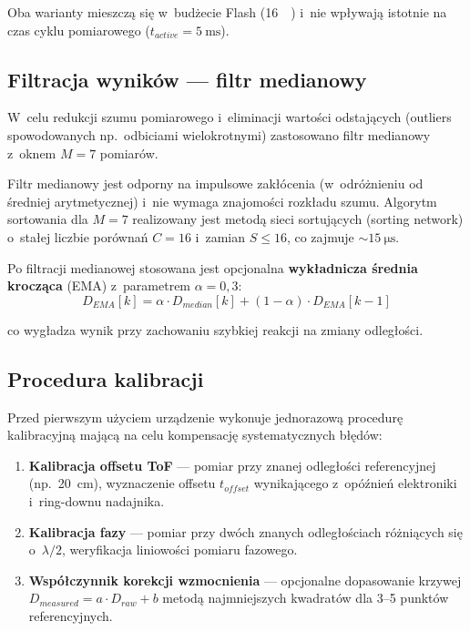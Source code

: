 \documentclass[a4paper,11pt]{article}
\begin{document}
Oba warianty mieszczą się w~budżecie Flash (\SI{16}{\kilo\byte}) i~nie wpływają
istotnie na czas cyklu pomiarowego ($t_{active} = \SI{5}{\milli\second}$).

\subsection{Filtracja wyników --- filtr medianowy}
\label{sec:filtr}

W~celu redukcji szumu pomiarowego i~eliminacji wartości odstających (outliers
spowodowanych np.\ odbiciami wielokrotnymi) zastosowano filtr medianowy
z~oknem $M = 7$ pomiarów.

Filtr medianowy jest odporny na impulsowe zakłócenia (w~odróżnieniu od średniej
arytmetycznej) i~nie wymaga znajomości rozkładu szumu. Algorytm sortowania
dla $M = 7$ realizowany jest metodą sieci sortujących (sorting network) o~stałej
liczbie porównań $C = 16$ i~zamian $S \leq 16$, co zajmuje ${\sim}\SI{15}{\micro\second}$.

Po filtracji medianowej stosowana jest opcjonalna \textbf{wykładnicza średnia
krocząca} (EMA) z~parametrem $\alpha = 0{,}3$:
\begin{equation}
    D_{EMA}[k] = \alpha \cdot D_{median}[k] + (1-\alpha) \cdot D_{EMA}[k-1]
    \label{eq:ema}
\end{equation}

co wygładza wynik przy zachowaniu szybkiej reakcji na zmiany odległości.

\subsection{Procedura kalibracji}
\label{sec:kalibracja}

Przed pierwszym użyciem urządzenie wykonuje jednorazową procedurę kalibracyjną
mającą na celu kompensację systematycznych błędów:

\begin{enumerate}[nosep]
    \item \textbf{Kalibracja offsetu ToF} --- pomiar przy znanej odległości
          referencyjnej (np.\ \SI{20}{\centi\metre}), wyznaczenie offsetu
          $t_{offset}$ wynikającego z~opóźnień elektroniki i~ring-downu nadajnika.
    \item \textbf{Kalibracja fazy} --- pomiar przy dwóch znanych odległościach
          różniących się o~$\lambda/2$, weryfikacja liniowości pomiaru fazowego.
    \item \textbf{Współczynnik korekcji wzmocnienia} --- opcjonalne dopasowanie
          krzywej $D_{measured} = a \cdot D_{raw} + b$ metodą najmniejszych
          kwadratów dla 3--5 punktów referencyjnych.
\end{enumerate}
\end{document}
